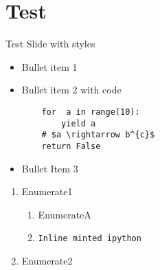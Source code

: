 
\section{Test}
\begin{frame}[fragile]{Test Slide with styles}
\begin{itemize}
\item Bullet item 1
\item Bullet item 2 with code
\begin{verbatim}
    for  a in range(10):
        yield a
    # $a \rightarrow b^{c}$
    return False
\end{verbatim}
\item Bullet Item 3
\end{itemize}
\begin{enumerate}
\item Enumerate1
    \begin{enumerate}
    \item EnumerateA
    \item \texttt{Inline minted ipython}
    \end{enumerate}

\item Enumerate2
\end{enumerate}
\end{frame}

